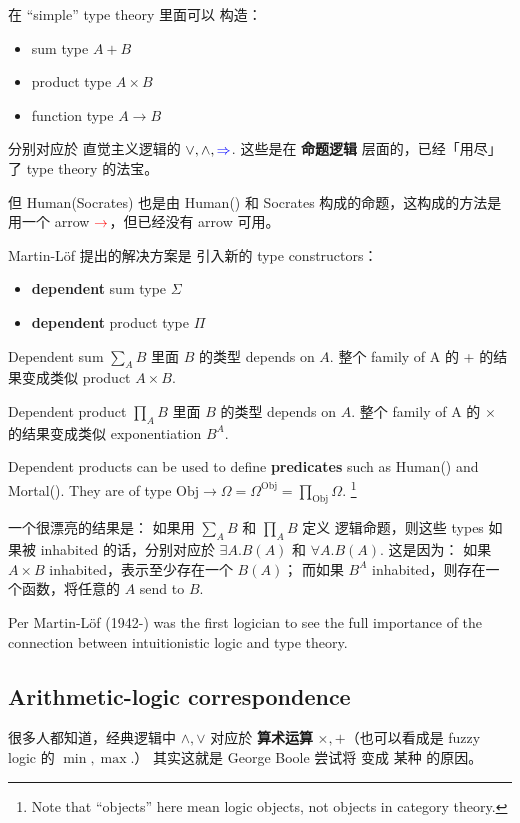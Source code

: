 在 ``simple'' type theory 里面可以 构造：
\begin{itemize}
	\item sum type $A + B$
	\item product type $A \times B$
	\item function type $A \rightarrow B$
\end{itemize}
分别对应於 直觉主义逻辑的 $\vee, \wedge, {\color{blue}\Rightarrow}$.  这些是在 \textbf{命题逻辑} 层面的，已经「用尽」了 type theory 的法宝。 

但 Human(Socrates) 也是由 Human() 和 Socrates 构成的命题，这构成的方法是用一个 arrow ${\color{red}\rightarrow}$，但已经没有 arrow 可用。 

Martin-L\"{o}f 提出的解决方案是 引入新的 type constructors：
\begin{itemize}
	\item \textbf{dependent} sum type $\Sigma$
	\item \textbf{dependent} product type $\Pi$
\end{itemize}

Dependent sum $\displaystyle \sum_A B$ 里面 $B$ 的类型 depends on $A$. 整个 family of A 的 + 的结果变成类似 product $A \times B$.

Dependent product $\displaystyle \prod_A B$ 里面 $B$ 的类型 depends on $A$. 整个 family of A 的 $\times$ 的结果变成类似 exponentiation $B^A$.

Dependent products can be used to define \textbf{predicates} such as Human() and Mortal().  They are of type $\displaystyle \mathrm{Obj} \rightarrow \Omega = \Omega^{\mathrm{Obj}} = \prod_{\mathrm{Obj}} \Omega$.  \footnote{Note that ``objects'' here mean logic objects, not objects in category theory.}

一个很漂亮的结果是： 如果用 $\sum_A B$ 和 $\prod_A B$ 定义 逻辑命题，则这些 types 如果被 inhabited 的话，分别对应於 $\exists A. B(A)$ 和 $\forall A. B(A)$. 这是因为： 如果 $A \times B$ inhabited，表示至少存在一个 $B(A)$； 而如果 $B^A$ inhabited，则存在一个函数，将任意的 $A$ send to $B$.

Per Martin-L\"{o}f (1942-) was the first logician to see the full importance of the connection between intuitionistic logic and type theory.

\subsection{Arithmetic-logic correspondence}

很多人都知道，经典逻辑中 $\wedge, \vee$ 对应於 \textbf{算术运算} $\times, +$（也可以看成是 fuzzy logic 的 $\min, \max$.） 其实这就是 George Boole 尝试将  变成 某种 的原因。


